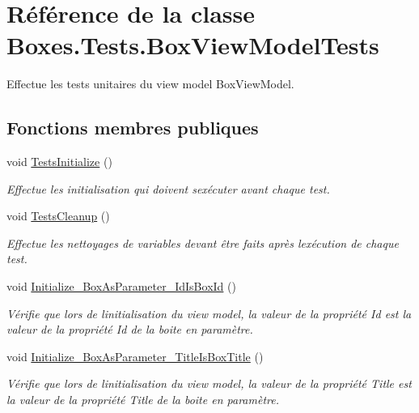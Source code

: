 \hypertarget{class_boxes_1_1_tests_1_1_box_view_model_tests}{}\section{Référence de la classe Boxes.\+Tests.\+Box\+View\+Model\+Tests}
\label{class_boxes_1_1_tests_1_1_box_view_model_tests}


Effectue les tests unitaires du view model Box\+View\+Model.  


\subsection*{Fonctions membres publiques}
\begin{DoxyCompactItemize}
\item 
void \hyperlink{class_boxes_1_1_tests_1_1_box_view_model_tests_a82cbb0fbb62d965f006597b6dc98ef5b}{Tests\+Initialize} ()
\begin{DoxyCompactList}\small\item\em Effectue les initialisation qui doivent s\textquotesingle{}exécuter avant chaque test. \end{DoxyCompactList}\item 
void \hyperlink{class_boxes_1_1_tests_1_1_box_view_model_tests_ad716bd33ddf90edbcfb65cf961633742}{Tests\+Cleanup} ()
\begin{DoxyCompactList}\small\item\em Effectue les nettoyages de variables devant être faits après l\textquotesingle{}exécution de chaque test. \end{DoxyCompactList}\item 
void \hyperlink{class_boxes_1_1_tests_1_1_box_view_model_tests_a81422a1a1c4e129876ba40889cac29d0}{Initialize\+\_\+\+Box\+As\+Parameter\+\_\+\+Id\+Is\+Box\+Id} ()
\begin{DoxyCompactList}\small\item\em Vérifie que lors de l\textquotesingle{}initialisation du view model, la valeur de la propriété {\ttfamily Id} est la valeur de la propriété {\ttfamily Id} de la boite en paramètre. \end{DoxyCompactList}\item 
void \hyperlink{class_boxes_1_1_tests_1_1_box_view_model_tests_a0adb07f5c44852b09e5e376e10dff44c}{Initialize\+\_\+\+Box\+As\+Parameter\+\_\+\+Title\+Is\+Box\+Title} ()
\begin{DoxyCompactList}\small\item\em Vérifie que lors de l\textquotesingle{}initialisation du view model, la valeur de la propriété {\ttfamily Title} est la valeur de la propriété {\ttfamily Title} de la boite en paramètre. \end{DoxyCompactList}\item 

\end{DoxyCompactItemize}

